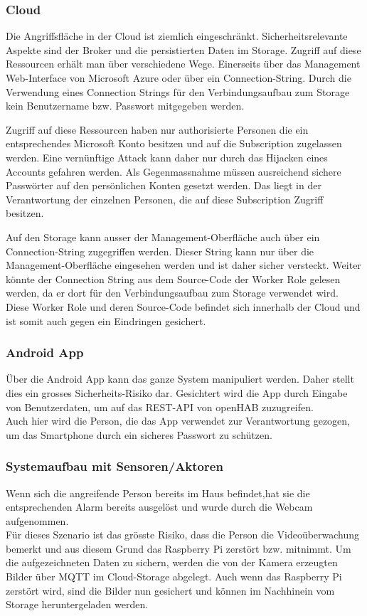 \subsubsection{Cloud}
Die Angriffsfläche in der Cloud ist ziemlich eingeschränkt. Sicherheitsrelevante Aspekte sind der Broker und die persistierten Daten im Storage. Zugriff auf diese Ressourcen erhält man über verschiedene Wege. Einerseits über das Management Web-Interface von Microsoft Azure oder über ein Connection-String. Durch die Verwendung eines Connection Strings für den Verbindungsaufbau zum Storage kein Benutzername bzw. Passwort mitgegeben werden.

Zugriff auf diese Ressourcen haben nur authorisierte Personen die ein entsprechendes Microsoft Konto besitzen und auf die Subscription zugelassen werden. Eine vernünftige Attack kann daher nur durch das Hijacken eines Accounts gefahren werden. Als Gegenmassnahme müssen ausreichend sichere Passwörter auf den persönlichen Konten gesetzt werden. Das liegt in der Verantwortung der einzelnen Personen, die auf diese Subscription Zugriff besitzen.

Auf den Storage kann ausser der Management-Oberfläche auch über ein Connection-String zugegriffen werden. Dieser String kann nur über die Management-Oberfläche eingesehen werden und ist daher sicher versteckt. Weiter könnte der Connection String aus dem Source-Code der Worker Role gelesen werden, da er dort für den Verbindungsaufbau zum Storage verwendet wird. Diese Worker Role und deren Source-Code befindet sich innerhalb der Cloud und ist somit auch gegen ein Eindringen gesichert. \\

\subsubsection{Android App}
Über die Android App kann das ganze System manipuliert werden. Daher stellt dies ein grosses Sicherheits-Risiko dar. Gesichtert wird die App durch Eingabe von Benutzerdaten, um auf das REST-API von openHAB zuzugreifen. \\
Auch hier wird die Person, die das App verwendet zur Verantwortung gezogen, um das Smartphone durch ein sicheres Passwort zu schützen.

\subsubsection{Systemaufbau mit Sensoren/Aktoren}
Wenn sich die angreifende Person bereits im Haus befindet,hat sie die entsprechenden Alarm bereits ausgelöst und wurde durch die Webcam aufgenommen. \\
Für dieses Szenario ist das grösste Risiko, dass die Person die Videoüberwachung bemerkt und aus diesem Grund das Raspberry Pi zerstört bzw. mitnimmt. Um die aufgezeichneten Daten zu sichern, werden die von der Kamera erzeugten Bilder über MQTT im Cloud-Storage abgelegt. Auch wenn das Raspberry Pi zerstört wird, sind die Bilder nun gesichert und können im Nachhinein vom Storage heruntergeladen werden.

